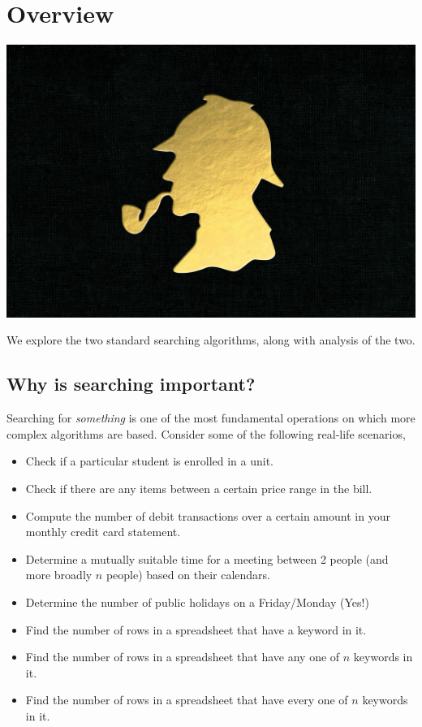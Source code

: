 \def\topic{Searching}


\section{Overview}

\begin{center}
\includegraphics[width=.4\textwidth]{images/sherlock.jpg}
\end{center}

    We explore the two standard searching algorithms, along with analysis of the two.
 
\subsection{Why is searching important?}

Searching for \emph{something} is one of the most fundamental operations on which more complex algorithms are based. Consider some of the following real-life scenarios,

\begin{itemize}
\item Check if a particular student is enrolled in a unit.
\item Check if there are any items between a certain price range in the bill.
\item Compute the number of debit transactions over a certain amount in your monthly credit card statement.	
\item Determine a mutually suitable time for a meeting between 2 people (and more broadly $n$ people) based on their calendars.
\item Determine the number of public holidays on a Friday/Monday (Yes!)
\item Find the number of rows in a spreadsheet that have a keyword in it.
\item Find the number of rows in a spreadsheet that have any one of $n$ keywords in it.
\item Find the number of rows in a spreadsheet that have every one of $n$ keywords in it.
\end{itemize}

